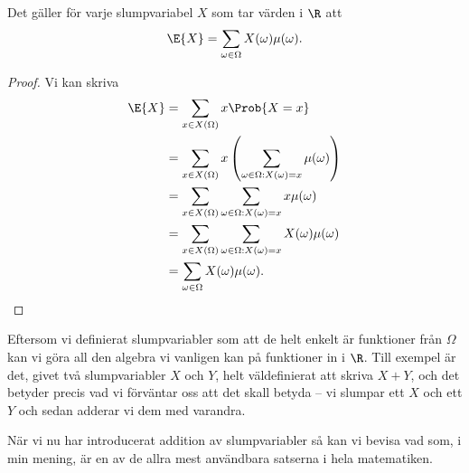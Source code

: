 \documentclass[nobib]{tufte-handout}
\begin{document}
\begin{lemma}\label{lemma_expectation_as_sum_over_omegas}
    Det gäller för varje slumpvariabel $X$ som tar värden i $\R$ att
    $$\E{X} = \sum_{\omega \in \Omega} X(\omega)\mu(\omega).$$

    \begin{proof}
        Vi kan skriva
        \begin{align*}
            \E{X} &= \sum_{x \in X(\Omega)} x \Prob{X = x}\\
            &= \sum_{x \in X(\Omega)} x\left(\sum_{\omega \in \Omega: X(\omega) = x} \mu(\omega)\right)\\
            &= \sum_{x \in X(\Omega)} \sum_{\omega \in \Omega: X(\omega) = x} x\mu(\omega)\\
            &= \sum_{x \in X(\Omega)} \sum_{\omega \in \Omega: X(\omega) = x} X(\omega)\mu(\omega)\\
            &= \sum_{\omega \in \Omega} X(\omega)\mu(\omega).
        \end{align*}
    \end{proof}
\end{lemma}

Eftersom vi definierat slumpvariabler som att de helt enkelt är funktioner från $\Omega$ kan vi göra all den algebra vi vanligen kan på funktioner in i $\R$. Till exempel är det, givet två slumpvariabler $X$ och $Y$, helt väldefinierat att skriva $X + Y$, och det betyder precis vad vi förväntar oss att det skall betyda -- vi slumpar ett $X$ och ett $Y$ och sedan adderar vi dem med varandra.

När vi nu har introducerat addition av slumpvariabler så kan vi bevisa vad som, i min mening, är en av de allra mest användbara satserna i hela matematiken.
\end{document}
